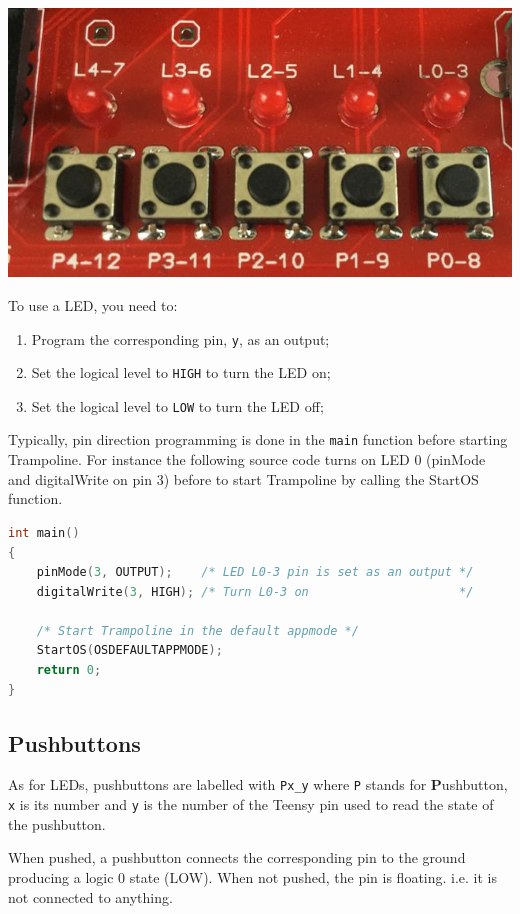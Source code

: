 \documentclass[11pt]{report}
\begin{document}
\begin{center}
\noindent\includegraphics[scale=0.35]{ledsbuttons.jpg}
\end{center}

To use a LED, you need to:
\begin{enumerate}
\item Program the corresponding pin, {\tt y}, as an output;
\item Set the logical level to {\tt HIGH} to turn the LED on;
\item Set the logical level to {\tt LOW} to turn the LED off;
\end{enumerate}

Typically, pin direction programming is done in the {\tt main} function before starting Trampoline. For instance the following source code turns on LED 0 (pinMode and digitalWrite on pin 3) before to start Trampoline by calling the StartOS function.

\begin{lstlisting}[language=C]
int main()
{
    pinMode(3, OUTPUT);    /* LED L0-3 pin is set as an output */
    digitalWrite(3, HIGH); /* Turn L0-3 on                     */

    /* Start Trampoline in the default appmode */
    StartOS(OSDEFAULTAPPMODE);
    return 0;
}
\end{lstlisting}

\subsection{Pushbuttons}

As for LEDs, pushbuttons are labelled with {\tt Px_y} where {\tt P} stands for {\bf P}ushbutton, {\tt x} is its number and {\tt y} is the number of the Teensy pin used to read the state of the pushbutton.

When pushed, a pushbutton connects the corresponding pin to the ground producing a logic 0 state (LOW). When not pushed, the pin is floating. i.e. it is not connected to anything.
\end{document}
